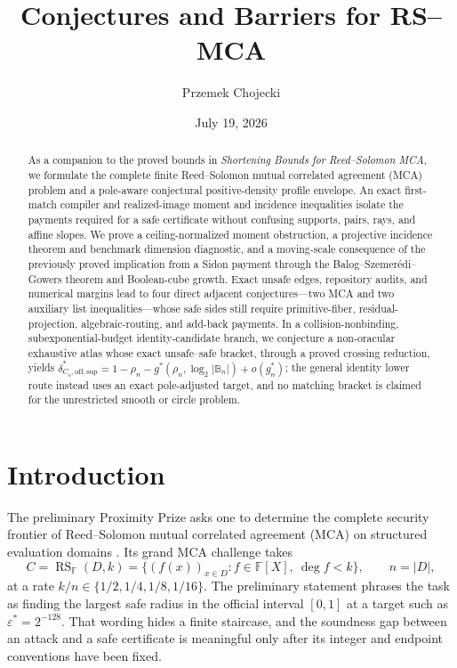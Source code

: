 \documentclass[a4paper,11pt]{amsart}
\title{Conjectures and Barriers for RS--MCA}
\author{Przemek Chojecki}
\date{July 19, 2026}
\theoremstyle{remark}
\DeclareMathOperator{\RS}{RS}
\newcommand{\F}{\mathbb F}
\newcommand{\abs}[1]{\lvert#1\rvert}
\begin{document}
\raggedbottom

\begin{abstract}
As a companion to the proved bounds in \emph{Shortening Bounds for Reed--Solomon MCA}, we formulate the complete finite Reed--Solomon mutual correlated agreement (MCA) problem and a pole-aware conjectural positive-density profile envelope.  An exact first-match compiler and realized-image moment and incidence inequalities isolate the payments required for a safe certificate without confusing supports, pairs, rays, and affine slopes.  We prove a ceiling-normalized moment obstruction, a projective incidence theorem and benchmark dimension diagnostic, and a moving-scale consequence of the previously proved implication from a Sidon payment through the Balog--Szemer\'edi--Gowers theorem and Boolean-cube growth.  Exact unsafe edges, repository audits, and numerical margins lead to four direct adjacent conjectures---two MCA and two auxiliary list inequalities---whose safe sides still require primitive-fiber, residual-projection, algebraic-routing, and add-back payments.  In a collision-nonbinding, subexponential-budget identity-candidate branch, we conjecture a non-oracular exhaustive atlas whose exact unsafe--safe bracket, through a proved crossing reduction, yields \(\delta^*_{C_n,\mathrm{off,sup}}=1-\rho_n-g^*(\rho_n,\log_2\abs{\mathbb B_n})+o(g_n^*)\); the general identity lower route instead uses an exact pole-adjusted target, and no matching bracket is claimed for the unrestricted smooth or circle problem.
\end{abstract}

\maketitle

\section{Introduction}\label{sec:intro}

The preliminary Proximity Prize asks one to determine the complete security
frontier of
Reed--Solomon mutual correlated agreement (MCA) on structured evaluation
domains \cite{ProximityPrize,ABF26}.  Its grand MCA challenge takes
\[
 C=\RS_{\F}(D,k)
 =\{(f(x))_{x\in D}:f\in\F[X],\ \deg f<k\},\qquad n=\abs D,
\]
at a rate \(k/n\in\{1/2,1/4,1/8,1/16\}\).  The preliminary statement phrases
the task as finding the largest safe radius in the official interval
\([0,1]\) at a target such as \(\varepsilon^*=2^{-128}\).  That wording hides a finite staircase,
and the soundness gap between an attack and a safe certificate is meaningful
only after its integer and endpoint conventions have been fixed.
\end{document}
